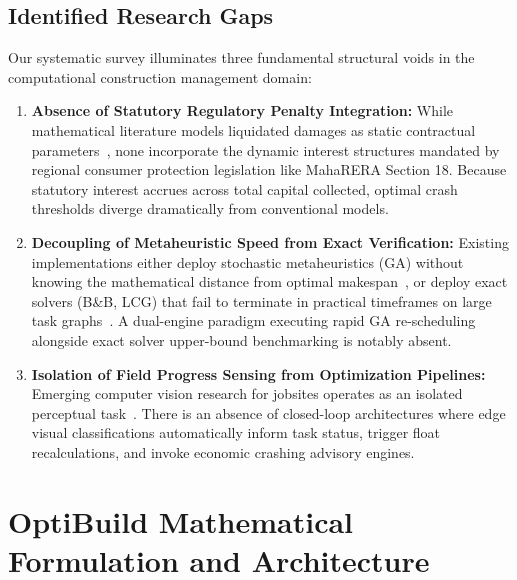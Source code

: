 \documentclass[conference]{IEEEtran}
\begin{document}
\subsection{Identified Research Gaps}
Our systematic survey illuminates three fundamental structural voids in the computational construction management domain:
\begin{enumerate}
    \item \textbf{Absence of Statutory Regulatory Penalty Integration:} While mathematical literature models liquidated damages as static contractual parameters~\cite{jain2023penalty,vaziri2024stochastic}, none incorporate the dynamic interest structures mandated by regional consumer protection legislation like MahaRERA Section 18. Because statutory interest accrues across total capital collected, optimal crash thresholds diverge dramatically from conventional models.
    \item \textbf{Decoupling of Metaheuristic Speed from Exact Verification:} Existing implementations either deploy stochastic metaheuristics (GA) without knowing the mathematical distance from optimal makespan~\cite{mahendra2025python,hartmann1998competitive}, or deploy exact solvers (B\&B, LCG) that fail to terminate in practical timeframes on large task graphs~\cite{sonmez2011discrete,schutt2013solving}. A dual-engine paradigm executing rapid GA re-scheduling alongside exact solver upper-bound benchmarking is notably absent.
    \item \textbf{Isolation of Field Progress Sensing from Optimization Pipelines:} Emerging computer vision research for jobsites operates as an isolated perceptual task~\cite{rashidi2024mobilenetv2,yang2023computer}. There is an absence of closed-loop architectures where edge visual classifications automatically inform task status, trigger float recalculations, and invoke economic crashing advisory engines.
\end{enumerate}

\section{OptiBuild Mathematical Formulation and Architecture}
\end{document}
